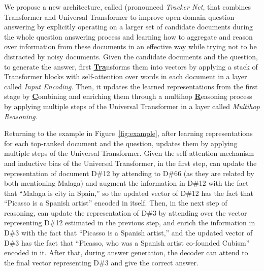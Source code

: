 We propose a new architecture, called \tracrnet (pronounced \emph{Tracker Net}, that combines Transformer and  Universal Transformer to improve open-domain question answering by explicitly operating on a larger set of candidate documents during the whole question answering process and learning how to aggregate and reason over information from these documents in an effective way while trying not to be distracted by noisy documents. 
% 
Given the candidate documents and the question, to generate the answer, \tracrnet first \underline{\textbf{Tra}}nsforms them into vectors by applying a stack of  Transformer blocks with self-attention over words in each document in a layer called \emph{Input Encoding}. 
Then, it updates the learned representations from the first stage by \underline{\textbf{C}}ombining and enriching them through a multihop \underline{\textbf{R}}easoning process by applying multiple steps of the Universal Transformer in a layer called \emph{Multihop Reasoning}.  

Returning to the example in Figure~\ref{fig:example}, after learning representations for each top-ranked document and the question, \tracrnet updates them by applying multiple steps of the Universal Transformer. 
Given the self-attention mechanism and inductive bias of the Universal Transformer, in the first step, \tracrnet can update the representation of document D\#12 by attending to D\#66 (as they are related by both mentioning Malaga) and augment the information in D\#12 with the fact that ``Malaga is city in Spain,'' so the updated vector of D\#12 has the fact that ``Picasso is a Spanish artist'' encoded in itself. 
Then, in the next step of reasoning, \tracrnet can update the representation of D\#3 by attending over the vector representing D\#12 estimated in the previous step, and enrich the information in D\#3 with the fact that ``Picasso is a Spanish artist,'' and the updated vector of D\#3 has the fact that ``Picasso, who was a Spanish artist co-founded Cubism'' encoded in it. 
After that, during answer generation, the decoder can attend to the final vector representing D\#3 and give the correct answer.

